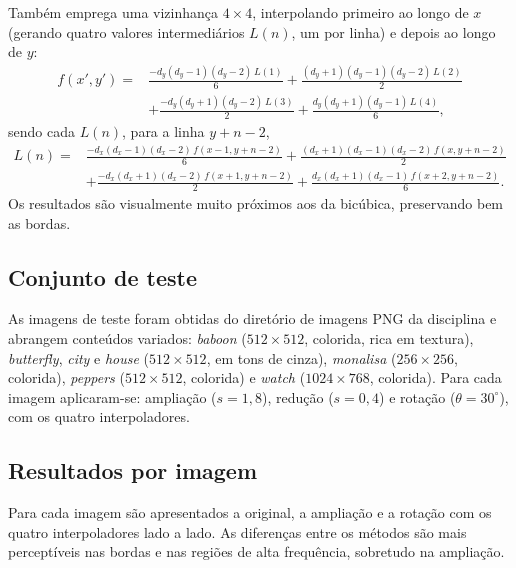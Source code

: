 \documentclass[12pt,a4paper]{article}
\begin{document}
Também emprega uma vizinhança $4 \times 4$, interpolando primeiro ao longo de
$x$ (gerando quatro valores intermediários $L(n)$, um por linha) e depois ao
longo de $y$:
\begin{equation}
  \begin{aligned}
    f(x', y') ={}&
      \frac{-d_y(d_y{-}1)(d_y{-}2)\,L(1)}{6}
    + \frac{(d_y{+}1)(d_y{-}1)(d_y{-}2)\,L(2)}{2} \\
    &+ \frac{-d_y(d_y{+}1)(d_y{-}2)\,L(3)}{2}
    + \frac{d_y(d_y{+}1)(d_y{-}1)\,L(4)}{6},
  \end{aligned}
  \label{eq:lagrange}
\end{equation}
sendo cada $L(n)$, para a linha $y + n - 2$,
\begin{equation*}
  \begin{aligned}
    L(n) ={}&
      \frac{-d_x(d_x{-}1)(d_x{-}2)\,f(x{-}1, y{+}n{-}2)}{6}
    + \frac{(d_x{+}1)(d_x{-}1)(d_x{-}2)\,f(x, y{+}n{-}2)}{2} \\
    &+ \frac{-d_x(d_x{+}1)(d_x{-}2)\,f(x{+}1, y{+}n{-}2)}{2}
    + \frac{d_x(d_x{+}1)(d_x{-}1)\,f(x{+}2, y{+}n{-}2)}{6}.
  \end{aligned}
\end{equation*}
Os resultados são visualmente muito próximos aos da bicúbica, preservando bem
as bordas.

\subsection{Conjunto de teste}

As imagens de teste foram obtidas do diretório de imagens PNG da disciplina e
abrangem conteúdos variados: \emph{baboon} ($512\times512$, colorida, rica em
textura), \emph{butterfly}, \emph{city} e \emph{house} ($512\times512$, em tons
de cinza), \emph{monalisa} ($256\times256$, colorida), \emph{peppers}
($512\times512$, colorida) e \emph{watch} ($1024\times768$, colorida). Para
cada imagem aplicaram-se: ampliação ($s = 1{,}8$), redução ($s = 0{,}4$) e
rotação ($\theta = 30^\circ$), com os quatro interpoladores.

\subsection{Resultados por imagem}

Para cada imagem são apresentados a original, a ampliação e a rotação com os
quatro interpoladores lado a lado. As diferenças entre os métodos são mais
perceptíveis nas bordas e nas regiões de alta frequência, sobretudo na
ampliação.
\end{document}
